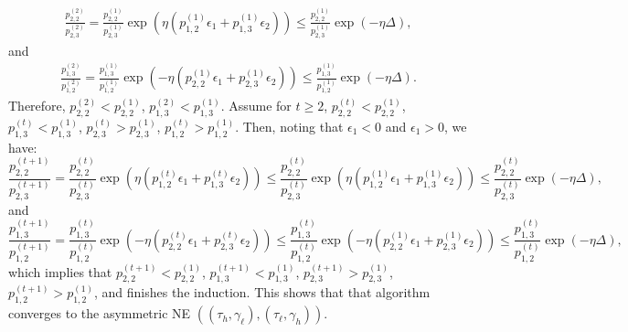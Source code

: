\begin{equation*}
    \begin{split}
\frac{p^{(2)}_{2,2}}{p^{(2)}_{2,3}} = \frac{p^{(1)}_{2,2}}{p^{(1)}_{2,3}}\exp\left(\eta\left(p^{(1)}_{1,2}\epsilon_1 + p^{(1)}_{1,3}\epsilon_2\right)\right) \leq   \frac{p^{(1)}_{2,2}}{p^{(1)}_{2,3}}\exp(-\eta\Delta),  
    \end{split}
\end{equation*}
and 
\begin{equation*}
    \begin{split}
\frac{p^{(2)}_{1,3}}{p^{(2)}_{1,2}} = \frac{p^{(1)}_{1,3}}{p^{(1)}_{1,2}}\exp\left(-\eta\left(p^{(1)}_{2,2}\epsilon_1 + p^{(1)}_{2,3}\epsilon_2\right)\right) \leq   \frac{p^{(1)}_{1,3}}{p^{(1)}_{1,2}}\exp(-\eta \Delta). 
    \end{split}
\end{equation*}
Therefore, $p_{2,2}^{(2)}< p_{2,2}^{(1)}$,  $p_{1,3}^{(2)}< p_{1,3}^{(1)}$. Assume for $t\geq 2$, $p_{2,2}^{(t)}< p_{2,2}^{(1)}$,  $p_{1,3}^{(t)}< p_{1,3}^{(1)}$,  $p_{2,3}^{(t)}> p_{2,3}^{(1)}$,  $p_{1,2}^{(t)}> p_{1,2}^{(1)}$. 
Then, noting that $\epsilon_1 < 0$ and $\epsilon_1 > 0$, we have:
\[
  \frac{p^{(t+1)}_{2,2}}{p^{(t+1)}_{2,3}} = \frac{p^{(t)}_{2,2}}{p^{(t)}_{2,3}}\exp\left(\eta\left(p^{(t)}_{1,2}\epsilon_1 + p^{(t)}_{1,3}\epsilon_2\right)\right) \leq \frac{p^{(t)}_{2,2}}{p^{(t)}_{2,3}}\exp\left(\eta\left(p^{(1)}_{1,2}\epsilon_1 + p^{(1)}_{1,3}\epsilon_2\right)\right)\leq \frac{p^{(t)}_{2,2}}{p^{(t)}_{2,3}}\exp(-\eta \Delta),
\]
and 
\[
  \frac{p^{(t+1)}_{1,3}}{p^{(t+1)}_{1,2}} = \frac{p^{(t)}_{1,3}}{p^{(t)}_{1,2}}\exp\left(-\eta\left(p^{(t)}_{2,2}\epsilon_1 + p^{(t)}_{2,3}\epsilon_2\right)\right) \leq \frac{p^{(t)}_{1,3}}{p^{(t)}_{1,2}}\exp\left(-\eta\left(p^{(1)}_{2,2}\epsilon_1 + p^{(1)}_{2,3}\epsilon_2\right)\right)\leq \frac{p^{(t)}_{1,3}}{p^{(t)}_{1,2}}\exp(-\eta \Delta),
\]
which implies that $p_{2,2}^{(t+1)}< p_{2,2}^{(1)}$,  $p_{1,3}^{(t+1)}< p_{1,3}^{(1)}$,  $p_{2,3}^{(t+1)}> p_{2,3}^{(1)}$,  $p_{1,2}^{(t+1)}> p_{1,2}^{(1)}$, and finishes the induction. This shows that that algorithm converges to the asymmetric NE $((\tau_{h},\gamma_{\ell}),(\tau_{\ell},\gamma_h))$.


